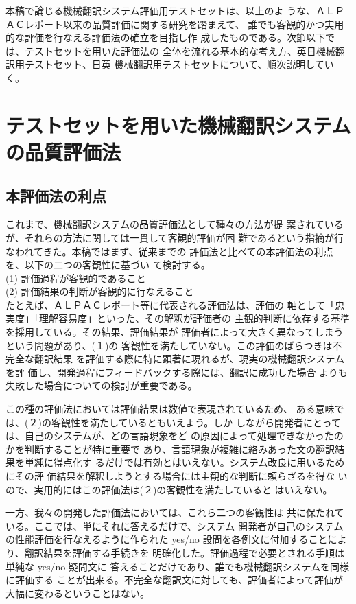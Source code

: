 本稿で論じる機械翻訳システム評価用テストセットは、以上のよ
うな、ＡＬＰＡＣレポート以来の品質評価に関する研究を踏まえて、
誰でも客観的かつ実用的な評価を行なえる評価法の確立を目指し作
成したものである。次節以下では、テストセットを用いた評価法の
全体を流れる基本的な考え方、英日機械翻訳用テストセット、日英
機械翻訳用テストセットについて、順次説明していく。

\section{テストセットを用いた機械翻訳システムの品質評価法}

\subsection{本評価法の利点}

これまで、機械翻訳システムの品質評価法として種々の方法が提
案されているが、それらの方法に関しては一貫して客観的評価が困
難であるという指摘が行なわれてきた。本稿ではまず、従来までの
評価法と比べての本評価法の利点を、以下の二つの客観性に基づい
て検討する。\\

\noindent \hspace*{1cm}(1) 評価過程が客観的であること\\
\noindent \hspace*{1cm}(2) 評価結果の判断が客観的に行なえること\\


たとえば、ＡＬＰＡＣレポート等に代表される評価法は、評価の
軸として「忠実度」「理解容易度」といった、その解釈が評価者の
主観的判断に依存する基準を採用している。その結果、評価結果が
評価者によって大きく異なってしまうという問題があり、(１)の
客観性を満たしていない。この評価のばらつきは不完全な翻訳結果
を評価する際に特に顕著に現れるが、現実の機械翻訳システムを評
価し、開発過程にフィードバックする際には、翻訳に成功した場合
よりも失敗した場合についての検討が重要である。

この種の評価法においては評価結果は数値で表現されているため、
ある意味では、(２)の客観性を満たしているともいえよう。しか
しながら開発者にとっては、自己のシステムが、どの言語現象をど
の原因によって処理できなかったのかを判断することが特に重要で
あり、言語現象が複雑に絡みあった文の翻訳結果を単純に得点化す
るだけでは有効とはいえない。システム改良に用いるためにその評
価結果を解釈しようとする場合には主観的な判断に頼らざるを得な
いので、実用的にはこの評価法は(２)の客観性を満たしていると
はいえない。

一方、我々の開発した評価法においては、これら二つの客観性は
共に保たれている。ここでは、単にそれに答えるだけで、システム
開発者が自己のシステムの性能評価を行なえるように作られた yes/no 
設問を各例文に付加することにより、翻訳結果を評価する手続きを
明確化した。評価過程で必要とされる手順は単純な yes/no 疑問文に
答えることだけであり、誰でも機械翻訳システムを同様に評価する
ことが出来る。不完全な翻訳文に対しても、評価者によって評価が
大幅に変わるということはない。

